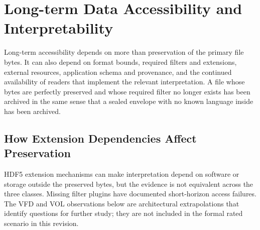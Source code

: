 \documentclass[../main.tex]{subfiles}
\begin{document}
\section{Long-term Data Accessibility and Interpretability}
\label{sec:long-haul}

Long-term accessibility depends on more than preservation of the primary file
bytes. It can also depend on format bounds, required filters and extensions,
external resources, application schema and provenance, and the continued
availability of readers that implement the relevant interpretation. A file
whose bytes are perfectly preserved and whose required filter no longer exists
has been archived in the same sense that a sealed envelope with no known
language inside has been archived.

\subsection{How Extension Dependencies Affect Preservation}

HDF5 extension mechanisms can make interpretation depend on software or storage
outside the preserved bytes, but the evidence is not equivalent across the
three classes. Missing filter plugins have documented short-horizon access
failures. The VFD and VOL observations below are architectural extrapolations
that identify questions for further study; they are not included in the formal
rated scenario in this revision.
\end{document}
